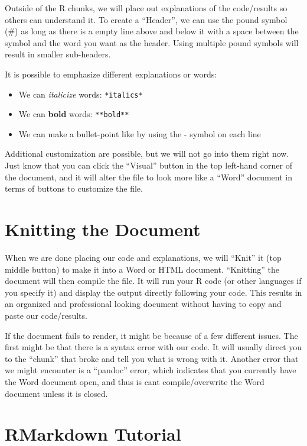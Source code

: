 \documentclass[
  letterpaper,
  DIV=11,
  numbers=noendperiod]{scrreprt}
\providecommand{\tightlist}{%
  \setlength{\itemsep}{0pt}\setlength{\parskip}{0pt}}
\begin{document}
Outside of the R chunks, we will place out explanations of the
code/results so others can understand it. To create a ``Header'', we can
use the pound symbol (\#) as long as there is a empty line above and
below it with a space between the symbol and the word you want as the
header. Using multiple pound symbols will result in smaller sub-headers.

It is possible to emphasize different explanations or words:

\begin{itemize}
\tightlist
\item
  We can \emph{italicize} words: \texttt{*italics*}
\item
  We can \textbf{bold} words: \texttt{**bold**}
\item
  We can make a bullet-point like by using the - symbol on each line
\end{itemize}

Additional customization are possible, but we will not go into them
right now. Just know that you can click the ``Visual'' button in the top
left-hand corner of the document, and it will alter the file to look
more like a ``Word'' document in terms of buttons to customize the file.

\section{Knitting the Document}\label{knitting-the-document}

When we are done placing our code and explanations, we will ``Knit'' it
(top middle button) to make it into a Word or HTML document.
``Knitting'' the document will then compile the file. It will run your R
code (or other languages if you specify it) and display the output
directly following your code. This results in an organized and
professional looking document without having to copy and paste our
code/results.

If the document fails to render, it might be because of a few different
issues. The first might be that there is a syntax error with our code.
It will usually direct you to the ``chunk'' that broke and tell you what
is wrong with it. Another error that we might encounter is a ``pandoc''
error, which indicates that you currently have the Word document open,
and thus is cant compile/overwrite the Word document unless it is
closed.

\section{RMarkdown Tutorial}\label{rmarkdown-tutorial}
\end{document}
